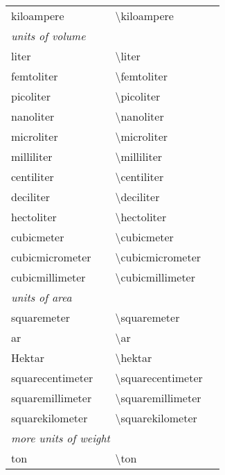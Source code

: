 \begin{longtable}{Xl>{\ttfamily\textbackslash}Xl}
     kiloampere       &\unitsignonly{\kiloampere}       &kiloampere&\cmd{\kA}\\[1ex]
     \multicolumn{4}{l}{\emph{units of volume}}\\[.5ex]
     liter            &\unitsignonly{\liter}            &liter&\\
     femtoliter       &\unitsignonly{\femtoliter}       &femtoliter&\cmd{\fl}\\
     picoliter        &\unitsignonly{\picoliter}        &picoliter&\cmd{\pl}\\
     nanoliter        &\unitsignonly{\nanoliter}        &nanoliter&\cmd{\nl}\\
     microliter       &\unitsignonly{\microliter}       &microliter&\cmd{\micl}\\
     milliliter       &\unitsignonly{\milliliter}       &milliliter&\cmd{\ml}\\
     centiliter       &\unitsignonly{\centiliter}       &centiliter&\cmd{\cl}\\
     deciliter        &\unitsignonly{\deciliter}        &deciliter&\cmd{\dl}\\
     hectoliter       &\unitsignonly{\hectoliter}       &hectoliter&\cmd{\hl}\\
     cubicmeter       &\unitsignonly{\cubicmeter}       &cubicmeter&\\
     cubicmicrometer  &\unitsignonly{\cubicmicrometer}  &cubicmicrometer&\\
     cubicmillimeter  &\unitsignonly{\cubicmillimeter}  &cubicmillimeter&\\[1ex]
     \multicolumn{4}{l}{\emph{units of area}}\\[.5ex]
     squaremeter      &\unitsignonly{\squaremeter}      &squaremeter&\\
     ar               &\unitsignonly{\ar}               &ar&\\
     Hektar           &\unitsignonly{\hektar}           &hektar&\\
     squarecentimeter &\unitsignonly{\squarecentimeter} &squarecentimeter&\\
     squaremillimeter &\unitsignonly{\squaremillimeter} &squaremillimeter&\\
     squarekilometer  &\unitsignonly{\squarekilometer}  &squarekilometer&\\[1ex]
     \multicolumn{4}{l}{\emph{more units of weight}}\\[.5ex]
     ton              &\unitsignonly{\ton}              &ton&\\[1ex]

\end{longtable}
